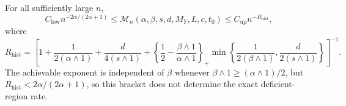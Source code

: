 For all sufficiently large \(n\),
\[
C_{\mathrm{low}}n^{-2\alpha/(2\alpha+1)}
\le\mathcal M_n(\alpha,\beta,s,d,M_Y,L,c,t_0)
\le C_{\mathrm{up}}n^{-R_{\mathrm{hist}}},
\]
where
\[
R_{\mathrm{hist}}=\left[1+\frac{1}{2(\alpha\wedge1)}+\frac{d}{4(s\wedge1)}+\left\{\frac12-\frac{\beta\wedge1}{\alpha\wedge1}\right\}_+\min\left\{\frac{1}{2(\beta\wedge1)},\frac{d}{2(s\wedge1)}\right\}\right]^{-1}.
\]
The achievable exponent is independent of \(\beta\) whenever \(\beta\wedge1\ge(\alpha\wedge1)/2\), but \(R_{\mathrm{hist}}<2\alpha/(2\alpha+1)\), so this bracket does not determine the exact deficient-region rate.
